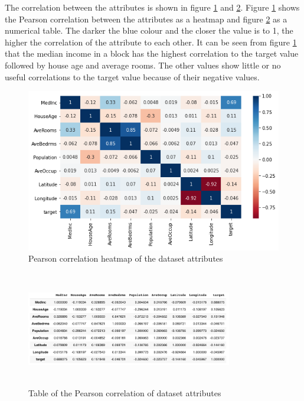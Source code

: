 \documentclass[conference]{IEEEtran}
\begin{document}
The correlation between the attributes is shown in figure \ref{fig:heatmap_correlation} and \ref{fig:Pearson_corr}. Figure \ref{fig:heatmap_correlation} shows the Pearson correlation between the attributes as a heatmap and figure \ref{fig:Pearson_corr} as a numerical table. The darker the blue colour and the closer the value is to 1, the higher the correlation of the attribute to each other. It can be seen from figure \ref{fig:heatmap_correlation} that the median income in a block has the highest correlation to the target value followed by house age and average rooms. The other values show little or no useful correlations to the target value because of their negative values.

\begin{figure}[htbp]
	\centerline{\includegraphics [scale=0.5]{figures/heatmap_correlation.png}}
	\caption{Pearson correlation heatmap of the dataset attributes}
	\label{fig:heatmap_correlation}
\end{figure}

\begin{figure}[htbp]
	\centerline{\includegraphics [width=90mm,scale=0.5,height=5cm]{figures/pearson_correlation_of_the_dataset.png}}
	\caption{Table of the Pearson correlation of dataset attributes}
	\label{fig:Pearson_corr}
\end{figure}
\end{document}
